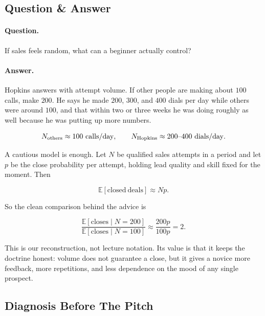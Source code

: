 \documentclass[11pt,oneside]{book}
\begin{document}
\subsection{Question \& Answer}

\paragraph{Question.}
If sales feels random, what can a beginner actually control?

\paragraph{Answer.}
Hopkins answers with attempt volume. If other people are making about \(100\) calls, make \(200\). He says he made \(200\), \(300\), and \(400\) dials per day while others were around \(100\), and that within two or three weeks he was doing roughly as well because he was putting up more numbers.

\begin{equation}
N_{\mathrm{others}} \approx 100\ \mathrm{calls/day},
\qquad
N_{\mathrm{Hopkins}} \approx 200\hbox{--}400\ \mathrm{dials/day}.
\end{equation}

A cautious model is enough. Let \(N\) be qualified sales attempts in a period and let \(p\) be the close probability per attempt, holding lead quality and skill fixed for the moment. Then

\begin{equation}
\mathbb{E}[\mathrm{closed\ deals}] \approx Np.
\end{equation}

So the clean comparison behind the advice is

\begin{equation}
\frac{\mathbb{E}[\mathrm{closes}\mid N=200]}
{\mathbb{E}[\mathrm{closes}\mid N=100]}
\approx
\frac{200p}{100p}
=
2.
\end{equation}

This is our reconstruction, not lecture notation. Its value is that it keeps the doctrine honest: volume does not guarantee a close, but it gives a novice more feedback, more repetitions, and less dependence on the mood of any single prospect.

\subsection{Diagnosis Before The Pitch}
\end{document}
